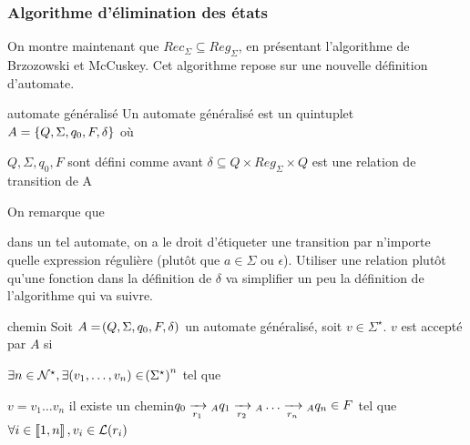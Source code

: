     \subsubsection{Algorithme d'élimination des états}
    
    On montre maintenant que $Rec_\Sigma \subseteq Reg_\Sigma$, en présentant l'algorithme de Brzozowski et McCuskey. Cet algorithme repose sur une nouvelle définition d'automate.
    
    \begin{definition}{automate généralisé}{}
        Un automate généralisé est un quintuplet $A = \left\{Q, \Sigma, q_0, F, \delta\right\}$ où
        \begin{enumerate}
            \itt $Q, \Sigma, q_0, F$ sont défini comme avant
            \itt $\delta \subseteq Q \times Reg_\Sigma \times Q$ est une relation de transition de A
        \end{enumerate}
    
    \end{definition}
    On remarque que
    \begin{enumerate}
        \itt  dans un tel automate, on a le droit d'étiqueter une transition par n'importe quelle expression régulière (plutôt que $a \in \Sigma$ ou $\epsilon$).
        \itt Utiliser une relation plutôt qu'une fonction dans la définition de $\delta$ va simplifier un peu la définition de l'algorithme qui va suivre.
    \end{enumerate}

    \begin{definition}{chemin}{}
        Soit $A = \!\left(Q, \Sigma, q_0, F, \delta\right)$ un automate généralisé, soit $v \in \Sigma^\star$. $v$ est accepté par $A$ si
        \begin{enumerate}
            \itt $\exists n \in \mathcal{N}^\star, \exists \!\left(v_1, \dots, v_n\right) \in \!\left(\Sigma^\star\right)^n$ tel que
            \begin{enumerate}
                \itt $v = v_1 \dots v_n$
                \itt il existe un chemin$q_0 \lima{r_1}{}_A q_1 \lima{r_2}{}_A \dots \lima{r_n}{}_A q_n \in F$ tel que $\forall i \in \left\llbracket1, n\right\rrbracket, v_i \in \mathcal{L}\!\left(r_i\right)$
            \end{enumerate}
        \end{enumerate}
        
    \end{definition}
    
